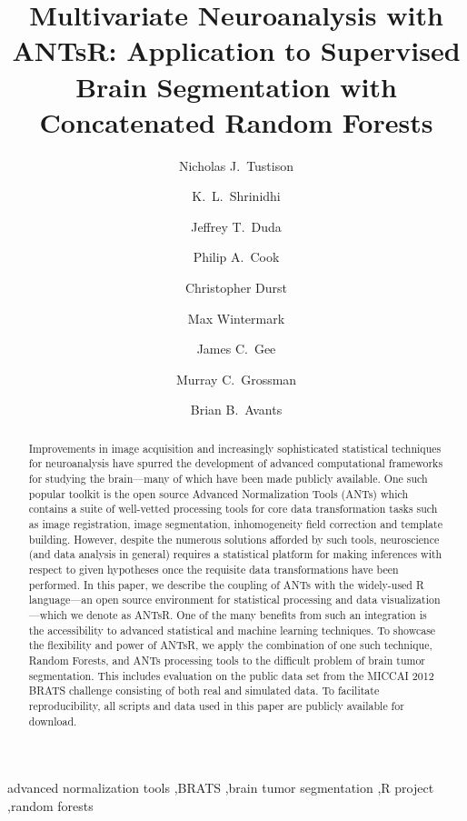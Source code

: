 \documentclass[final,5p,times,twocolumn]{elsarticle}
\begin{document}
\begin{frontmatter}

\title{Multivariate Neuroanalysis with ANTsR:  Application to Supervised Brain Segmentation with Concatenated Random Forests}

\author[label1]{Nicholas J.~Tustison
  }
\author[label2]{K.~L.~Shrinidhi}
\author[label2]{Jeffrey T.~Duda}
\author[label2]{Philip A.~Cook}
\author[label1]{Christopher Durst}
\author[label1]{Max Wintermark}
\author[label1]{James C.~Gee}
\author[label1]{Murray C.~Grossman}
\author[label2]{Brian B.~Avants}
\address[label1]{Department of Radiology and Medical Imaging, University of Virginia, Charlottesville, VA}
\address[label2]{Penn Image Computing and Science Laboratory, University of Pennsylvania,
                Philadelphia, PA}


\linenumbers

\begin{abstract} 
Improvements in image acquisition and increasingly sophisticated statistical techniques 
for neuroanalysis have spurred the development of advanced computational frameworks for studying the
brain---many of which
have been made publicly available.  One such popular toolkit is the open source Advanced
Normalization Tools (ANTs) which contains a suite of well-vetted processing tools for
core data transformation tasks such as image registration, image segmentation, 
inhomogeneity field correction and template building.  However, despite the numerous
solutions afforded by such tools, neuroscience (and data analysis in general) requires
a statistical platform for making inferences with respect to given hypotheses once the 
requisite data transformations have been performed.  In this paper, we describe the
coupling of ANTs with the widely-used R language---an open source environment for 
statistical processing and data visualization---which we denote as ANTsR.  One of the
many benefits from such an integration is the accessibility to advanced statistical 
and machine learning techniques.  To showcase the flexibility and power of ANTsR, we 
apply the combination of one such technique, Random Forests, and ANTs processing 
tools to the difficult problem of brain tumor segmentation.  This includes evaluation on 
the public data set from the MICCAI 2012 BRATS challenge consisting of both real and simulated
data.  To facilitate reproducibility, all scripts and data used in this paper are 
publicly available for download.  
\end{abstract}

\begin{keyword}
advanced normalization tools \sep BRATS \sep brain tumor segmentation \sep R project \sep random forests
\end{keyword}

\end{frontmatter}
%
%
\newpage
\end{document}
